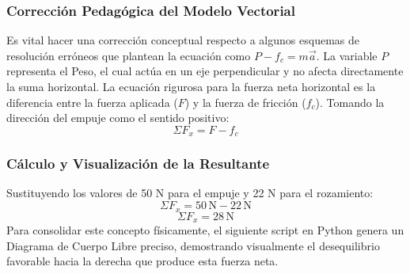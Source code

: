 \documentclass[12pt]{article}
\begin{document}
\subsubsection*{Corrección Pedagógica del Modelo Vectorial}
Es vital hacer una corrección conceptual respecto a algunos esquemas de resolución erróneos que plantean la ecuación como $P - f_c = m \vec{a}$. La variable $P$ representa el Peso, el cual actúa en un eje perpendicular y no afecta directamente la suma horizontal. La ecuación rigurosa para la fuerza neta horizontal es la diferencia entre la fuerza aplicada ($F$) y la fuerza de fricción ($f_c$).
Tomando la dirección del empuje como el sentido positivo:
\begin{equation}
    \Sigma F_x = F - f_c
\end{equation}

\subsubsection*{Cálculo y Visualización de la Resultante}
Sustituyendo los valores de 50 N para el empuje y 22 N para el rozamiento:
\begin{equation}
    \Sigma F_x = 50 \, \text{N} - 22 \, \text{N}
\end{equation}
\begin{equation}
    \Sigma F_x = 28 \, \text{N}
\end{equation}
Para consolidar este concepto físicamente, el siguiente script en Python genera un Diagrama de Cuerpo Libre preciso, demostrando visualmente el desequilibrio favorable hacia la derecha que produce esta fuerza neta.
\end{document}
